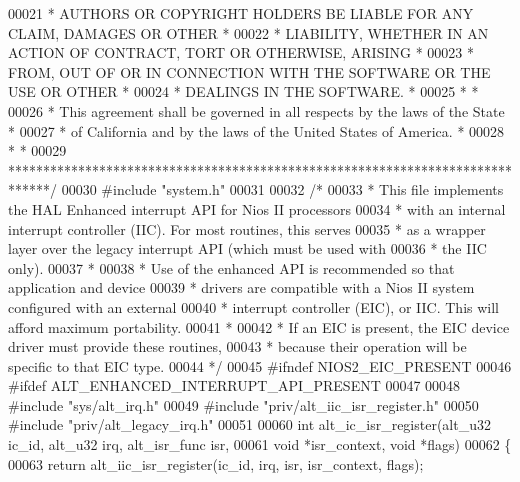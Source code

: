 \begin{DoxyCode}
00021 \textcolor{comment}{* AUTHORS OR COPYRIGHT HOLDERS BE LIABLE FOR ANY CLAIM, DAMAGES OR OTHER      *}
00022 \textcolor{comment}{* LIABILITY, WHETHER IN AN ACTION OF CONTRACT, TORT OR OTHERWISE, ARISING     *}
00023 \textcolor{comment}{* FROM, OUT OF OR IN CONNECTION WITH THE SOFTWARE OR THE USE OR OTHER         *}
00024 \textcolor{comment}{* DEALINGS IN THE SOFTWARE.                                                   *}
00025 \textcolor{comment}{*                                                                             *}
00026 \textcolor{comment}{* This agreement shall be governed in all respects by the laws of the State   *}
00027 \textcolor{comment}{* of California and by the laws of the United States of America.              *}
00028 \textcolor{comment}{*                                                                             *}
00029 \textcolor{comment}{******************************************************************************/}
00030 \textcolor{preprocessor}{#include "system.h"}
00031 
00032 \textcolor{comment}{/*}
00033 \textcolor{comment}{ * This file implements the HAL Enhanced interrupt API for Nios II processors}
00034 \textcolor{comment}{ * with an internal interrupt controller (IIC). For most routines, this serves }
00035 \textcolor{comment}{ * as a wrapper layer over the legacy interrupt API (which must be used with }
00036 \textcolor{comment}{ * the IIC only). }
00037 \textcolor{comment}{ *}
00038 \textcolor{comment}{ * Use of the enhanced API is recommended so that application and device}
00039 \textcolor{comment}{ * drivers are compatible with a Nios II system configured with an external }
00040 \textcolor{comment}{ * interrupt controller (EIC), or IIC. This will afford maximum portability. }
00041 \textcolor{comment}{ *}
00042 \textcolor{comment}{ * If an EIC is present, the EIC device driver must provide these routines, }
00043 \textcolor{comment}{ * because their operation will be specific to that EIC type. }
00044 \textcolor{comment}{ */}
00045 \textcolor{preprocessor}{#ifndef NIOS2\_EIC\_PRESENT}
00046 \textcolor{preprocessor}{#ifdef ALT\_ENHANCED\_INTERRUPT\_API\_PRESENT}
00047 
00048 \textcolor{preprocessor}{#include "sys/alt_irq.h"}
00049 \textcolor{preprocessor}{#include "priv/alt_iic_isr_register.h"}
00050 \textcolor{preprocessor}{#include "priv/alt_legacy_irq.h"}
00051                             
00060 \textcolor{keywordtype}{int} alt\_ic\_isr\_register(alt_u32 ic\_id, alt_u32 irq, alt_isr_func isr, 
00061   \textcolor{keywordtype}{void} *isr\_context, \textcolor{keywordtype}{void} *flags)
00062 \{
00063     \textcolor{keywordflow}{return} alt_iic_isr_register(ic\_id, irq, isr, isr\_context, flags);

\end{DoxyCode}
